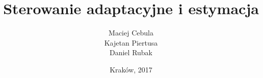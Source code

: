 \documentclass[12pt]{report}
\title{\textbf{Sterowanie adaptacyjne i estymacja}}
\author{Maciej Cebula \\Kajetan Piertusa \\ Daniel Rubak}
\date{Kraków, 2017}
\begin{document}
	
	

	
	\setcounter{tocdepth}{2}
	
	\maketitle
	\tableofcontents
	\clearpage
		
		\renewcommand{\tablename}{Tabela}
		\renewcommand{\figurename}{Rys.}
		
	
	
	
	

	
	
	
\end{document}
